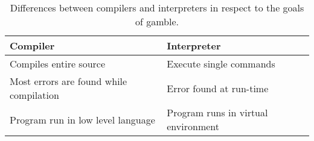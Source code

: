 \begin{table}[h]
    \centering
    \begin{tabular}{|l|l|}
    \hline
    \textbf{Compiler}                           & \textbf{Interpreter}           \\ \hline
    Compiles entire source                      & Execute single commands         \\ \hline 
    Most errors are found while compilation     & Error found at run-time \\ \hline 
    Program run in low level language           & Program runs in virtual environment      \\ \hline   
    \end{tabular} 
    \caption{Differences between compilers and interpreters in respect to the goals of \gls{gamble}.}
    \label{tbl:compint}
\end{table}
